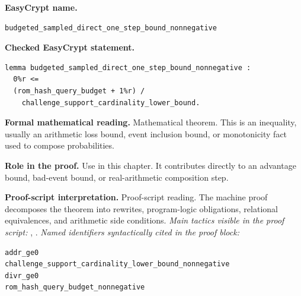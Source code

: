 \begin{formaltheorem}
\noindent\textbf{EasyCrypt name.}
\begin{lstlisting}[language=EasyCrypt,basicstyle=\ttfamily\scriptsize]
budgeted_sampled_direct_one_step_bound_nonnegative
\end{lstlisting}
\noindent\textbf{Checked EasyCrypt statement.}
\begin{lstlisting}[language=EasyCrypt,basicstyle=\ttfamily\scriptsize]
lemma budgeted_sampled_direct_one_step_bound_nonnegative :
  0%r <=
  (rom_hash_query_budget + 1%r) /
    challenge_support_cardinality_lower_bound.
\end{lstlisting}
\noindent\textbf{Formal mathematical reading.}
Mathematical theorem. This is an inequality, usually an arithmetic loss bound, event inclusion bound, or monotonicity fact used to compose probabilities.

\noindent\textbf{Role in the proof.}
Use in this chapter. It contributes directly to an advantage bound, bad-event bound, or real-arithmetic composition step.

\noindent\textbf{Proof-script interpretation.}
Proof-script reading. The machine proof decomposes the theorem into rewrites, program-logic obligations, relational equivalences, and arithmetic side conditions.
\emph{Main tactics visible in the proof script:} , .
\emph{Named identifiers syntactically cited in the proof block:}
\begin{lstlisting}[language=EasyCrypt,basicstyle=\ttfamily\scriptsize]
addr_ge0
challenge_support_cardinality_lower_bound_nonnegative
divr_ge0
rom_hash_query_budget_nonnegative
\end{lstlisting}

\end{formaltheorem}

